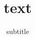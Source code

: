 \documentclass{beamer}
\title{text}
\subtitle{subtitle}
\begin{document}
\begin{frame}
\maketitle
\end{frame}
\end{document}
